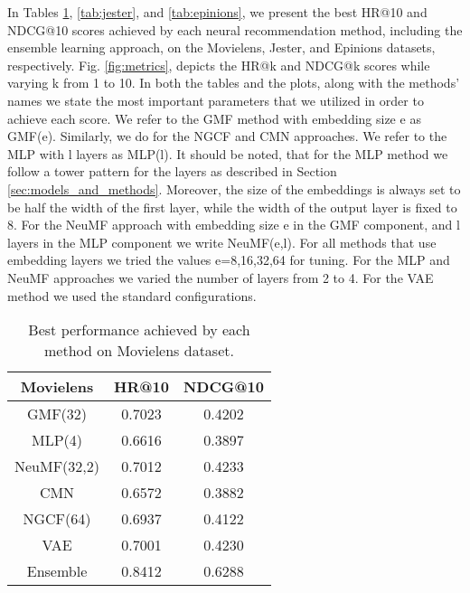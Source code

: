 In Tables \ref{tab:movielens}, \ref{tab:jester}, and \ref{tab:epinions}, we present the best HR@10 and NDCG@10 scores achieved by each neural recommendation method, including the ensemble learning approach, on the Movielens, Jester, and Epinions datasets, respectively.
Fig. \ref{fig:metrics}, depicts the HR@k and NDCG@k scores while varying k from 1 to 10.
In both the tables and the plots, along with the methods' names we state the most important parameters that we utilized in order to achieve each score.
We refer to the GMF method with embedding size e as GMF(e).
Similarly, we do for the NGCF and CMN approaches.
We refer to the MLP with l layers as MLP(l).
It should be noted, that for the MLP method we follow a tower pattern for the layers as described in Section \ref{sec:models_and_methods}.
Moreover, the size of the embeddings is always set to be half the width of the first layer, while the width of the output layer is fixed to 8.
For the NeuMF approach with embedding size e in the GMF component, and l layers in the MLP component we write NeuMF(e,l).
For all methods that use embedding layers we tried the values e=8,16,32,64 for tuning.
For the MLP and NeuMF approaches we varied the number of layers from 2 to 4.
For the VAE method we used the standard configurations.

\begin{table}[h]
    \centering
    \begin{tabular}{c|c|c}
        \hline
        Movielens & HR@10  & NDCG@10 \\
        \hline
        GMF(32)     & 0.7023 & 0.4202  \\
        MLP(4)      & 0.6616 & 0.3897 \\
        NeuMF(32,2) & 0.7012 & 0.4233 \\
        CMN         & 0.6572&  0.3882 \\
        NGCF(64)    & 0.6937 & 0.4122 \\
        VAE         & 0.7001 & 0.4230 \\
        Ensemble    & 0.8412 & 0.6288
    \end{tabular}
    \caption{Best performance achieved by each method on Movielens dataset.}
    \label{tab:movielens}
\end{table}


